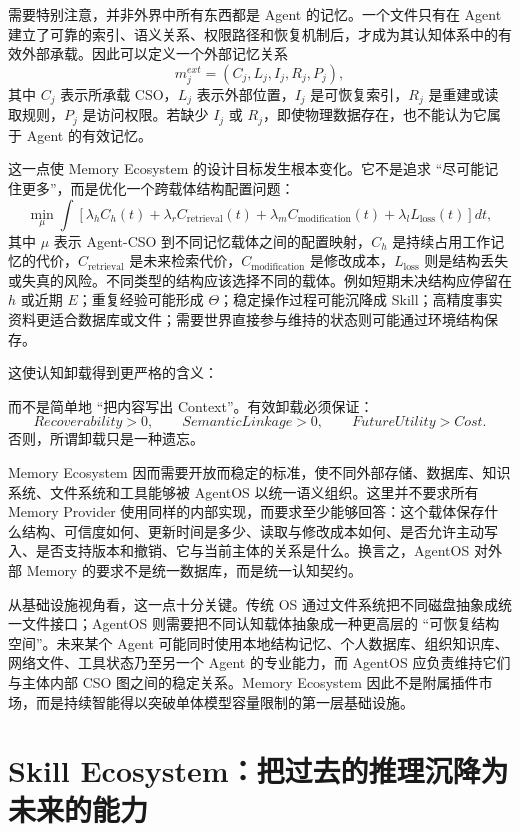 需要特别注意，并非外界中所有东西都是 Agent 的记忆。一个文件只有在 Agent 建立了可靠的索引、语义关系、权限路径和恢复机制后，才成为其认知体系中的有效外部承载。因此可以定义一个外部记忆关系
\[
m_j^{ext}
=
(C_j,L_j,I_j,R_j,P_j),
\]
其中 $C_j$ 表示所承载 CSO，$L_j$ 表示外部位置，$I_j$ 是可恢复索引，$R_j$ 是重建或读取规则，$P_j$ 是访问权限。若缺少 $I_j$ 或 $R_j$，即使物理数据存在，也不能认为它属于 Agent 的有效记忆。

这一点使 Memory Ecosystem 的设计目标发生根本变化。它不是追求 ``尽可能记住更多''，而是优化一个跨载体结构配置问题：
\[
\min_{\mu}
\int
\left[
\lambda_h C_h(t)
+
\lambda_r C_{\mathrm{retrieval}}(t)
+
\lambda_m C_{\mathrm{modification}}(t)
+
\lambda_l L_{\mathrm{loss}}(t)
\right]dt,
\]
其中 $\mu$ 表示 Agent-CSO 到不同记忆载体之间的配置映射，$C_h$ 是持续占用工作记忆的代价，$C_{\mathrm{retrieval}}$ 是未来检索代价，$C_{\mathrm{modification}}$ 是修改成本，$L_{\mathrm{loss}}$ 则是结构丢失或失真的风险。不同类型的结构应该选择不同的载体。例如短期未决结构应停留在 $h$ 或近期 $E$；重复经验可能形成 $\Theta$；稳定操作过程可能沉降成 Skill；高精度事实资料更适合数据库或文件；需要世界直接参与维持的状态则可能通过环境结构保存。

这使认知卸载得到更严格的含义：
\begin{statementbox}
\centering
{}
\end{statementbox}
而不是简单地 ``把内容写出 Context''。有效卸载必须保证：
\[
Recoverability>0,\qquad
SemanticLinkage>0,\qquad
FutureUtility>Cost.
\]
否则，所谓卸载只是一种遗忘。

Memory Ecosystem 因而需要开放而稳定的标准，使不同外部存储、数据库、知识系统、文件系统和工具能够被 AgentOS 以统一语义组织。这里并不要求所有 Memory Provider 使用同样的内部实现，而要求至少能够回答：这个载体保存什么结构、可信度如何、更新时间是多少、读取与修改成本如何、是否允许主动写入、是否支持版本和撤销、它与当前主体的关系是什么。换言之，AgentOS 对外部 Memory 的要求不是统一数据库，而是统一认知契约。

从基础设施视角看，这一点十分关键。传统 OS 通过文件系统把不同磁盘抽象成统一文件接口；AgentOS 则需要把不同认知载体抽象成一种更高层的 ``可恢复结构空间''。未来某个 Agent 可能同时使用本地结构记忆、个人数据库、组织知识库、网络文件、工具状态乃至另一个 Agent 的专业能力，而 AgentOS 应负责维持它们与主体内部 CSO 图之间的稳定关系。Memory Ecosystem 因此不是附属插件市场，而是持续智能得以突破单体模型容量限制的第一层基础设施。

\section{Skill Ecosystem：把过去的推理沉降为未来的能力}

